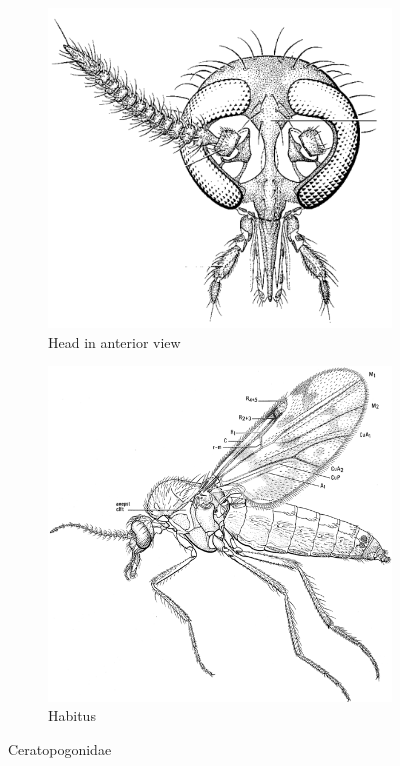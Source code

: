\documentclass[letterpaper, 11pt]{article}
\begin{document}
\begin{figure}[ht!]
    \centering
    \begin{subfigure}[ht!]{0.3\textwidth}
        \includegraphics[width=\textwidth]{CeratopogonidHead}
        \caption{Head in anterior view \citep[][Fig. 28.4]{mcalpine1981manual}}
        \label{fig:ceratopogonid1}
    \end{subfigure}
    \qquad 
    \begin{subfigure}[ht!]{0.45\textwidth}
        \includegraphics[width=\textwidth]{CeratopogonidHabitus}
        \caption{Habitus \citep[][Fig. 28.13]{mcalpine1981manual}}
        \label{fig:ceratopogonid2}
    \end{subfigure}
    \caption{Ceratopogonidae}\label{fig:ceratopogonids}
\end{figure}
\end{document}
